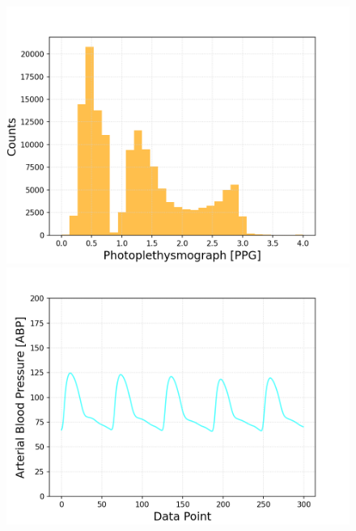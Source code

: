 \documentclass{article}
\begin{document}
\begin{figure}[h!]
\begin{minipage}[b]{0.32\textwidth}
	\end{minipage}
	\begin{minipage}[b]{0.32\textwidth}
		\includegraphics[width=\textwidth]{plots/histo_PPG.png}
		
	\end{minipage}
	\begin{minipage}[b]{0.32\textwidth}
		\includegraphics[width=\textwidth]{plots/series_ABP_zoom.png}
		

\end{minipage}
\end{figure}
\end{document}
